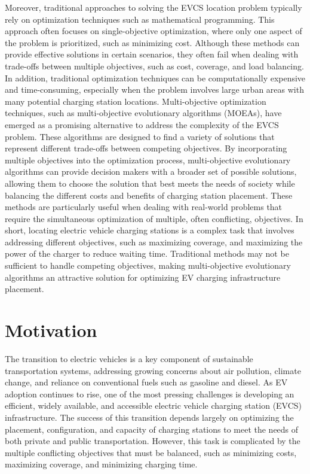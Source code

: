 \documentclass[12pt]{report}
\begin{document}
Moreover, traditional approaches to solving the EVCS location problem typically rely on optimization techniques such as mathematical programming. This approach often focuses on single-objective optimization, where only one aspect of the problem is prioritized, such as minimizing cost. Although these methods can provide effective solutions in certain scenarios, they often fail when dealing with trade-offs between multiple objectives, such as cost, coverage, and load balancing. In addition, traditional optimization techniques can be computationally expensive and time-consuming, especially when the problem involves large urban areas with many potential charging station locations. Multi-objective optimization techniques, such as multi-objective evolutionary algorithms (MOEAs), have emerged as a promising alternative to address the complexity of the EVCS problem. These algorithms are designed to find a variety of solutions that represent different trade-offs between competing objectives. By incorporating multiple objectives into the optimization process, multi-objective evolutionary algorithms can provide decision makers with a broader set of possible solutions, allowing them to choose the solution that best meets the needs of society while balancing the different costs and benefits of charging station placement. These methods are particularly useful when dealing with real-world problems that require the simultaneous optimization of multiple, often conflicting, objectives. In short, locating electric vehicle charging stations is a complex task that involves addressing different objectives, such as maximizing coverage,  and maximizing the power of the charger to reduce waiting time. Traditional methods may not be sufficient to handle competing objectives, making multi-objective evolutionary algorithms an attractive solution for optimizing EV charging infrastructure placement.
\section{Motivation}
The transition to electric vehicles is a key component of sustainable transportation systems, addressing growing concerns about air pollution, climate change, and reliance on conventional fuels such as gasoline and diesel. As EV adoption continues to rise, one of the most pressing challenges is developing an efficient, widely available, and accessible electric vehicle charging station (EVCS) infrastructure. The success of this transition depends largely on optimizing the placement, configuration, and capacity of charging stations to meet the needs of both private and public transportation. However, this task is complicated by the multiple conflicting objectives that must be balanced, such as minimizing costs, maximizing coverage, and minimizing charging time.
\end{document}
